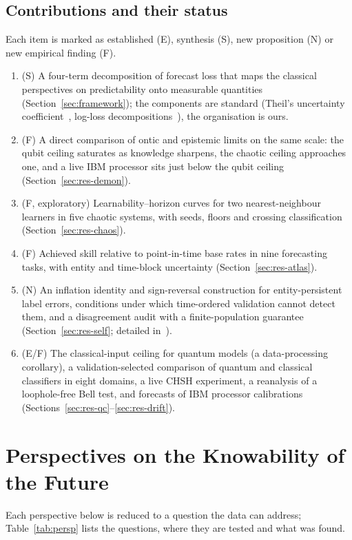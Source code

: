 \documentclass[journal]{IEEEtran}
\theoremstyle{definition}
\begin{document}
\subsection{Contributions and their status}
Each item is marked as established (E), synthesis (S), new proposition (N) or new empirical finding (F).
\begin{enumerate}
\item (S) A four-term decomposition of forecast loss that maps the classical perspectives on predictability onto measurable quantities (Section~\ref{sec:framework}); the components are standard (Theil's uncertainty coefficient~\cite{theil1970estimation}, log-loss decompositions~\cite{weijs2010kl,roulston2002evaluating}), the organisation is ours.
\item (F) A direct comparison of ontic and epistemic limits on the same scale: the qubit ceiling saturates as knowledge sharpens, the chaotic ceiling approaches one, and a live IBM processor sits just below the qubit ceiling (Section~\ref{sec:res-demon}).
\item (F, exploratory) Learnability--horizon curves for two nearest-neighbour learners in five chaotic systems, with seeds, floors and crossing classification (Section~\ref{sec:res-chaos}).
\item (F) Achieved skill relative to point-in-time base rates in nine forecasting tasks, with entity and time-block uncertainty (Section~\ref{sec:res-atlas}).
\item (N) An inflation identity and sign-reversal construction for entity-persistent label errors, conditions under which time-ordered validation cannot detect them, and a disagreement audit with a finite-population guarantee (Section~\ref{sec:res-self}; detailed in~\cite{abraham2026illusory}).
\item (E/F) The classical-input ceiling for quantum models (a data-processing corollary), a validation-selected comparison of quantum and classical classifiers in eight domains, a live CHSH experiment, a reanalysis of a loophole-free Bell test, and forecasts of IBM processor calibrations (Sections~\ref{sec:res-qc}--\ref{sec:res-drift}).
\end{enumerate}

\section{Perspectives on the Knowability of the Future}\label{sec:perspectives}
Each perspective below is reduced to a question the data can address; Table~\ref{tab:persp} lists the questions, where they are tested and what was found.
\end{document}
